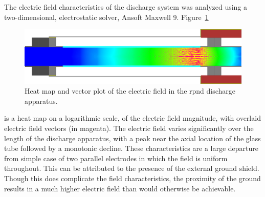 The electric field characteristics of the discharge system was analyzed using a
two-dimensional, electrostatic solver, Ansoft Maxwell 9. Figure~\ref{fig:fields}
\begin{figure}
  \centering
  \includegraphics{./chapters/experiment/figures/fields.jpg}
  \caption{Heat map and vector plot of the electric field in the \acs{rpnd}
  discharge apparatus.}
  \label{fig:fields}
\end{figure}
is a heat map on a logarithmic scale, of the electric field magnitude, with
overlaid electric field vectors (in magenta). The electric field varies
significantly over the length of the discharge apparatus, with a peak near the
axial location of the glass tube followed by a monotonic decline. These
characteristics are a large departure from simple case of two parallel
electrodes in which the field is uniform throughout. This can be attributed to
the presence of the external ground shield. Though this does complicate the
field characteristics, the proximity of the ground results in a much higher
electric field than would otherwise be achievable.


